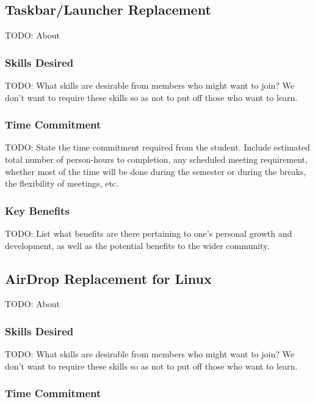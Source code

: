 \documentclass[11pt,fleqn]{article}
\begin{document}
\newpage

\subsection{Taskbar/Launcher Replacement}

TODO: About

\subsubsection*{Skills Desired}

TODO: What skills are desirable from members who might want to join?  We don't want to require these skills so as not to put off those who want to learn.

\subsubsection*{Time Commitment}

TODO: State the time commitment required from the student.  Include estimated total number of person-hours to completion, any scheduled meeting requirement, whether most of the time will be done during the semester or during the breaks, the flexibility of meetings, etc.

\subsubsection*{Key Benefits}

TODO: List what benefits are there pertaining to one's personal growth and development, as well as the potential benefits to the wider community.

\newpage

\subsection{AirDrop Replacement for Linux}

TODO: About

\subsubsection*{Skills Desired}

TODO: What skills are desirable from members who might want to join?  We don't want to require these skills so as not to put off those who want to learn.

\subsubsection*{Time Commitment}
\end{document}

